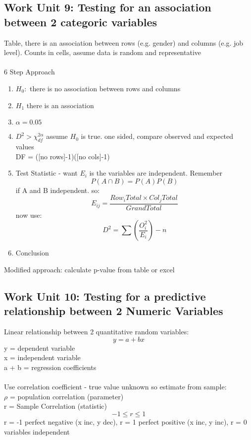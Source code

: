 \documentclass[a4paper,10pt]{article}
\begin{document}
\subsection{Work Unit 9: Testing for an association between 2 categoric variables}

Table, there is an association between rows (e.g. gender) and columns (e.g. job level). Counts in cells, assume data is random and representative
\\ \\
6 Step Approach
\begin{enumerate}
	\item $H_0: $ there is no association between rows and columns
	\item $H_1$ there is an association
	\item $\alpha = 0.05$
	\item $D^2 > \chi^{2\alpha}_{df}$ assume $H_0$ is true. one sided, compare observed and expected values \\ DF = ([no rows]-1)([no cols]-1)
	\item Test Statistic - want $E_i$ is the variables are independent. Remember \[P(A\cap B) = P(A)P(B)\] if A and B independent. so: \[E_{ij} = \frac{Row_i Total \times Col_j Total}{GrandTotal}\] now use: \[D^2 = \sum(\frac{O_i^2}{E_i})-n\]
	\item Conclusion
\end{enumerate}

Modified approach: calculate p-value from table or excel

\subsection{Work Unit 10: Testing for a predictive relationship between 2 Numeric Variables}

Linear relationship between 2 quantitative random variables:
\[ y = a +bx\]
y = dependent variable \\
x = independent variable\\
a + b = regression coefficients
\\ \\
Use correlation coefficient - true value unknown so estimate from sample: \\
$\rho$ = population correlation (parameter) \\
r = Sample Correlation (statistic) \\
\[-1 \leq r \leq 1\]
 r = -1 perfect negative (x inc, y dec), r = 1 perfect positive (x inc, y inc), r = 0 variables independent 
 
\end{document}
